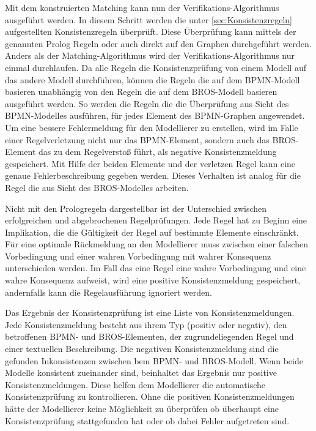 Mit dem konstruierten Matching kann nun der Verifikations-Algorithmus ausgeführt werden.
In diesem Schritt werden die unter \cref{sec:Konsistenzregeln} aufgestellten Konsistenzregeln überprüft.
Diese Überprüfung kann mittels der genannten Prolog Regeln oder auch direkt auf den Graphen durchgeführt werden.
Anders als der Matching-Algorithmus wird der Verifikations-Algorithmus nur einmal durchlaufen.
Da alle Regeln die Konsistenzprüfung von einem Modell auf das andere Modell durchführen, können die Regeln die auf dem BPMN-Modell basieren unabhängig von den Regeln die auf dem BROS-Modell basieren ausgeführt werden.
So werden die Regeln die die Überprüfung aus Sicht des BPMN-Modelles ausführen, für jedes Element des BPMN-Graphen angewendet.
Um eine bessere Fehlermeldung für den Modellierer zu erstellen, wird im Falle einer Regelverletzung nicht nur das BPMN-Element, sondern auch das BROS-Element das zu dem Regelverstoß führt, als negative Konsistenzmeldung gespeichert.
Mit Hilfe der beiden Elemente und der verletzen Regel kann eine genaue Fehlerbeschreibung gegeben werden.
Dieses Verhalten ist analog für die Regel die aus Sicht des BROS-Modelles arbeiten.

Nicht mit den Prologregeln dargestellbar ist der Unterschied zwischen erfolgreichen und abgebrochenen Regelprüfungen.
Jede Regel hat zu Beginn eine Implikation, die die Gültigkeit der Regel auf bestimmte Elemente einschränkt.
Für eine optimale Rückmeldung an den Modellierer muss zwischen einer falschen Vorbedingung und einer wahren Vorbedingung mit wahrer Konsequenz unterschieden werden.
Im Fall das eine Regel eine wahre Vorbedingung und eine wahre Konsequenz aufweist, wird eine positive Konsistenzmeldung gespeichert, andernfalls kann die Regelausführung ignoriert werden.

Das Ergebnis der Konsistenzprüfung ist eine Liste von Konsistenzmeldungen.
Jede Konsistenzmeldung besteht aus ihrem Typ (positiv oder negativ), den betroffenen BPMN- und BROS-Elementen, der zugrundeliegenden Regel und einer textuellen Beschreibung.
Die negativen Konsistenzmeldung sind die gefunden Inkonsistenzen zwischen bem BPMN- und BROS-Modell.
Wenn beide Modelle konsistent zueinander sind, beinhaltet das Ergebnis nur positive Konsistenzmeldungen.
Diese helfen dem Modellierer die automatische Konsistenzprüfung zu kontrollieren.
Ohne die positiven Konsistenzmeldungen hätte der Modellierer keine Möglichkeit zu überprüfen ob überhaupt eine Konsistenzprüfung stattgefunden hat oder ob dabei Fehler aufgetreten sind.
